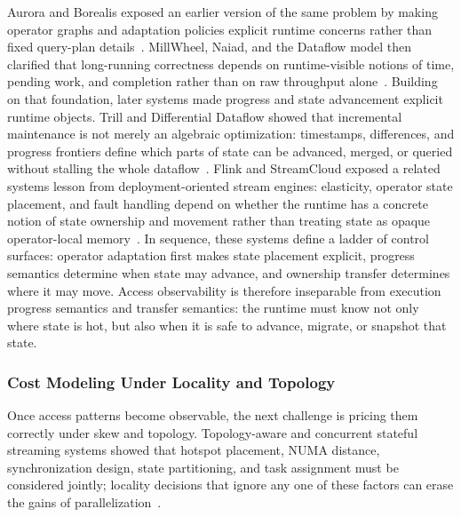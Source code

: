 \documentclass[acmsmall,screen,review]{acmart}
\begin{document}
Aurora and Borealis exposed an earlier version of the same problem by making operator graphs and adaptation policies explicit runtime concerns rather than fixed query-plan details~\cite{abadi2003aurora,abadi2005borealis}. MillWheel, Naiad, and the Dataflow model then clarified that long-running correctness depends on runtime-visible notions of time, pending work, and completion rather than on raw throughput alone~\cite{akidau2013millwheel,murray2013naiad,akidau2015dataflow}. Building on that foundation, later systems made progress and state advancement explicit runtime objects. Trill and Differential Dataflow showed that incremental maintenance is not merely an algebraic optimization: timestamps, differences, and progress frontiers define which parts of state can be advanced, merged, or queried without stalling the whole dataflow~\cite{chandramouli2014trill,murray2013differential}. Flink and StreamCloud exposed a related systems lesson from deployment-oriented stream engines: elasticity, operator state placement, and fault handling depend on whether the runtime has a concrete notion of state ownership and movement rather than treating state as opaque operator-local memory~\cite{carbone2015flink,gulisano2012streamcloud}. In sequence, these systems define a ladder of control surfaces: operator adaptation first makes state placement explicit, progress semantics determine when state may advance, and ownership transfer determines where it may move. Access observability is therefore inseparable from execution progress semantics and transfer semantics: the runtime must know not only where state is hot, but also when it is safe to advance, migrate, or snapshot that state.

\subsubsection{Cost Modeling Under Locality and Topology}

Once access patterns become observable, the next challenge is pricing them correctly under skew and topology. Topology-aware and concurrent stateful streaming systems showed that hotspot placement, NUMA distance, synchronization design, state partitioning, and task assignment must be considered jointly; locality decisions that ignore any one of these factors can erase the gains of parallelization~\cite{zhang2019briskstream,zhang2020concurrent}.
\end{document}
